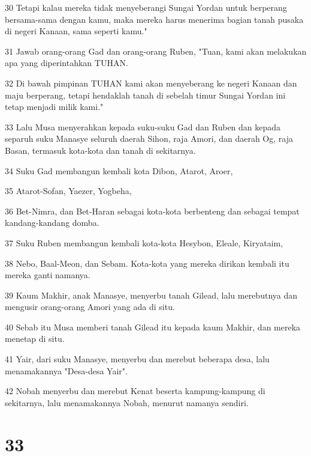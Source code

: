 \par 30 Tetapi kalau mereka tidak menyeberangi Sungai Yordan untuk berperang bersama-sama dengan kamu, maka mereka harus menerima bagian tanah pusaka di negeri Kanaan, sama seperti kamu."
\par 31 Jawab orang-orang Gad dan orang-orang Ruben, "Tuan, kami akan melakukan apa yang diperintahkan TUHAN.
\par 32 Di bawah pimpinan TUHAN kami akan menyeberang ke negeri Kanaan dan maju berperang, tetapi hendaklah tanah di sebelah timur Sungai Yordan ini tetap menjadi milik kami."
\par 33 Lalu Musa menyerahkan kepada suku-suku Gad dan Ruben dan kepada separuh suku Manasye seluruh daerah Sihon, raja Amori, dan daerah Og, raja Basan, termasuk kota-kota dan tanah di sekitarnya.
\par 34 Suku Gad membangun kembali kota Dibon, Atarot, Aroer,
\par 35 Atarot-Sofan, Yaezer, Yogbeha,
\par 36 Bet-Nimra, dan Bet-Haran sebagai kota-kota berbenteng dan sebagai tempat kandang-kandang domba.
\par 37 Suku Ruben membangun kembali kota-kota Hesybon, Eleale, Kiryataim,
\par 38 Nebo, Baal-Meon, dan Sebam. Kota-kota yang mereka dirikan kembali itu mereka ganti namanya.
\par 39 Kaum Makhir, anak Manasye, menyerbu tanah Gilead, lalu merebutnya dan mengusir orang-orang Amori yang ada di situ.
\par 40 Sebab itu Musa memberi tanah Gilead itu kepada kaum Makhir, dan mereka menetap di situ.
\par 41 Yair, dari suku Manasye, menyerbu dan merebut beberapa desa, lalu menamakannya "Desa-desa Yair".
\par 42 Nobah menyerbu dan merebut Kenat beserta kampung-kampung di sekitarnya, lalu menamakannya Nobah, menurut namanya sendiri.

\chapter{33}

